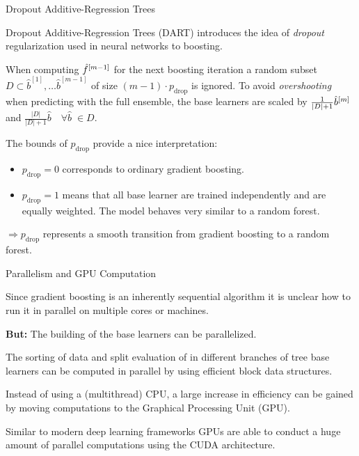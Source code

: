 \begin{vbframe}{Dropout Additive-Regression Trees}

  Dropout Additive-Regression Trees (DART) introduces the idea of \emph{dropout} regularization used in neural networks to boosting.

  \lz

  When computing $\hat{f}^{[m-1]}$ for the next boosting iteration a random subset $D \subset \hat{b}^{[1]}, \dots \hat{b}^{[m-1]}$ of size $(m-1) \cdot p_\text{drop}$ is ignored.
  To avoid \emph{overshooting} when predicting with the full ensemble, the base learners are scaled by $\frac{1}{|D| + 1}\hat{b}^{[m]}$ and $\frac{|D|}{|D| + 1}\hat{b}\quad \forall \hat{b}\;\in D$.

  \lz

  The bounds of $p_\text{drop}$ provide a nice interpretation:
  \begin{itemize}
    \item $p_\text{drop}=0$ corresponds to ordinary gradient boosting.
    \item $p_\text{drop}=1$ means that all base learner are trained independently and are equally weighted. The model behaves very similar to a random forest.
  \end{itemize}
  $\Rightarrow p_\text{drop}$ represents a smooth transition from gradient boosting to a random forest.



\end{vbframe}


\begin{vbframe}{Parallelism and GPU Computation}

  Since gradient boosting is an inherently sequential algorithm it is unclear how to run it in parallel on multiple cores or machines.

  \lz

  \textbf{But:} The building of the base learners can be parallelized.

  \lz

  The sorting of data and split evaluation of in different branches of tree base learners can be computed in parallel by using efficient block data structures.

  \lz

  Instead of using a (multithread) CPU, a large increase in efficiency can be gained by moving computations to the Graphical Processing Unit (GPU).

  \lz

  Similar to modern deep learning frameworks GPUs are able to conduct a huge amount of parallel computations using the CUDA architecture.


\end{vbframe}

